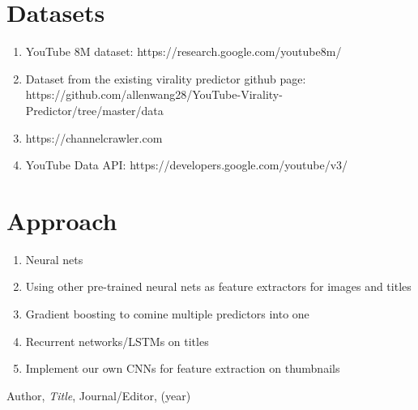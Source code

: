 \documentclass[12pt]{article}
\theoremstyle{definition}
\theoremstyle{remark}
\begin{document}
\section{Datasets}
\begin{enumerate}
\item YouTube 8M dataset: https://research.google.com/youtube8m/
  \item Dataset from the existing virality predictor github page: https://github.com/allenwang28/YouTube-Virality-Predictor/tree/master/data 
\item https://channelcrawler.com 
\item YouTube Data API: https://developers.google.com/youtube/v3/ 
\end{enumerate}
\section{Approach}

\begin{enumerate}
\item Neural nets
  \item Using other pre-trained neural nets as feature extractors for images and titles
  \item Gradient boosting to comine multiple predictors into one
  \item Recurrent networks/LSTMs on titles
  \item Implement our own CNNs for feature extraction on thumbnails
\end{enumerate}


\begin{thebibliography}{99}

 Author, \emph{Title}, Journal/Editor, (year)

\end{thebibliography}
\end{document}
